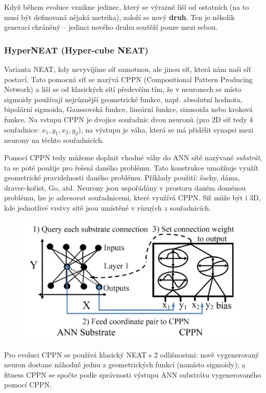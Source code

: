 Když během evoluce vznikne jedinec, který se výrazně liší od ostatních (na to musí být definovaná nějaká metrika), založí se nový \textbf{druh}. Ten je několik generací chráněný -- jedinci nového druhu soutěží pouze mezi sebou.

\subsubsection{HyperNEAT (Hyper-cube NEAT)}
Varianta NEAT, kdy nevyvíjíme síť samotnou, ale jinou síť, která nám naši síť postaví. Tato pomocná síť se nazývá CPPN (Compositional Pattern Producing Network) a liší se od klasických sítí především tím, že v neuronech se místo sigmoidy používají nejrůznější geometrické funkce, např. absolutní hodnota, bipolární sigmoida, Gaussovská funkce, lineární funkce, sinusoida nebo kroková funkce. Na vstupu CPPN je dvojice souřadnic dvou neuronů (pro 2D síť tedy 4 souřadnice: $x_1, y_1, x_2, y_2$), na výstupu je váha, která se má přidělit synapsi mezi neurony na těchto souřadnicích.

Pomocí CPPN tedy můžeme doplnit vhodné váhy do ANN sítě nazývané \textit{substrát}, ta se poté použije pro řešení daného problému. Tato konstrukce umožňuje využít geometrické pravidelnosti daného problému. Příklady použití: šachy, dáma, dravec-kořist, Go, atd. Neurony jsou uspořádány v prostoru daném doménou problému, lze je adresovat souřadnicemi, které využívá CPPN. Síť může být i 3D, kde jednotlivé vrstvy sítě jsou umístěné v různých $z$ souřadnicích.

\begin{figure}[h]
	\centering
	\includegraphics[]{img/hyperneat.png}
\end{figure}

Pro evoluci CPPN se používá klasický NEAT s 2 odlišnostmi: nově vygenerovaný neuron dostane náhodně jednu z geometrických funkcí (namísto sigmoidy); a fitness CPPN se spočte podle správnosti výstupu ANN substrátu vygenerovaného pomocí CPPN.

